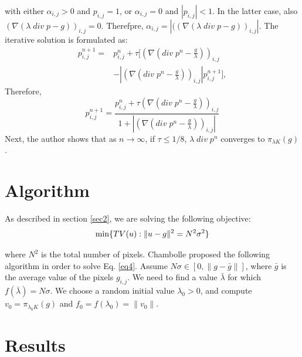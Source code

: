 \documentclass[11pt]{article}
\begin{document}
with either $\alpha_{i,j} > 0$ and $p_{i,j} = 1$, or $\alpha_{i,j} = 0$ and $|p_{i,j}| < 1$. In the latter case, also $(\nabla(\lambda \; div \; p - g))_{i,j} = 0$. Therefpre, $\alpha_{i,j} = |((\nabla(\lambda \; div \; p - g))_{i,j}|$. The iterative solution is formulated as:
\vspace{-5pt}
\begin{eqnarray*}
  p_{i,j}^{n+1} = & p_{i,j}^n + \tau [ (\nabla(div \; p^{n} - \frac{g}{\lambda}))_{i,j}  \\
  		& -|(\nabla(div \; p^{n} - \frac{g}{\lambda}))_{i,j}| p_{i,j}^{n+1} ],
\end{eqnarray*}
Therefore,
\begin{equation}
p_{i,j}^{n+1} = \frac{p_{i,j}^{n} + \tau (\nabla(div \; p^{n} - \frac{g}{\lambda}))_{i,j} }{ 1 +  |(\nabla(div \; p^{n} - \frac{g}{\lambda}))_{i,j}| }
\label{eq3}
\end{equation}
\vspace{-5pt}
Next, the author shows that as $n \rightarrow \infty$, if $\tau \le 1/8$, $\lambda \; div \; p^{n}$ converges to $\pi_{\lambda K}(g)$.

\vspace{-10pt}
\section{Algorithm}
\label{sec3}
\vspace{-10pt}

As described in section \ref{sec2}, we are solving the following objective:
\vspace{-5pt}
\begin{equation}
	\min\{TV(u) : \| u - g \|^2 = N^2\sigma^2\}
\vspace{-5pt}
\label{eq4}
\end{equation}

where $N^2$ is the total number of pixels. Chambolle proposed the following algorithm in order to solve Eq. \ref{eq4}. Assume $N\sigma \in [0, \| g - \bar{g}\|]$, where $\bar{g}$ is the average value of the pixels $g_{i,j}$. We need to find a value $\bar{\lambda}$ for which $f(\bar{\lambda}) = N\sigma$. We choose a random initial value $\lambda_{0} > 0$, and compute $v_0 = \pi_{\lambda_0 K}(g)$ and $f_0 = f(\lambda_0) = \| v_0\| $.

\vspace{-10pt}
\section{Results}
\label{sec4}
\end{document}
